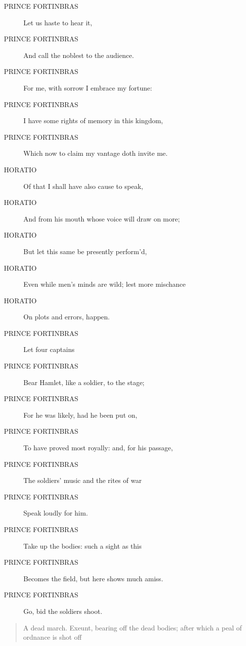 \documentclass{article}
\begin{document}
\begin{description}
            
\item[PRINCE FORTINBRAS] Let us haste to hear it,
\item[PRINCE FORTINBRAS] And call the noblest to the audience.
\item[PRINCE FORTINBRAS] For me, with sorrow I embrace my fortune:
\item[PRINCE FORTINBRAS] I have some rights of memory in this kingdom,
\item[PRINCE FORTINBRAS] Which now to claim my vantage doth invite me.
\end{description}
          
\begin{description}
            
\item[HORATIO] Of that I shall have also cause to speak,
\item[HORATIO] And from his mouth whose voice will draw on more;
\item[HORATIO] But let this same be presently perform'd,
\item[HORATIO] Even while men's minds are wild; lest more mischance
\item[HORATIO] On plots and errors, happen.
\end{description}
          
\begin{description}
            
\item[PRINCE FORTINBRAS] Let four captains
\item[PRINCE FORTINBRAS] Bear Hamlet, like a soldier, to the stage;
\item[PRINCE FORTINBRAS] For he was likely, had he been put on,
\item[PRINCE FORTINBRAS] To have proved most royally: and, for his passage,
\item[PRINCE FORTINBRAS] The soldiers' music and the rites of war
\item[PRINCE FORTINBRAS] Speak loudly for him.
\item[PRINCE FORTINBRAS] Take up the bodies: such a sight as this
\item[PRINCE FORTINBRAS] Becomes the field, but here shows much amiss.
\item[PRINCE FORTINBRAS] Go, bid the soldiers shoot.
\end{description}
          
\begin{quote}
A dead march. Exeunt, bearing off the dead
bodies; after which a peal of ordnance is shot off
\end{quote}
          
\end{document}
